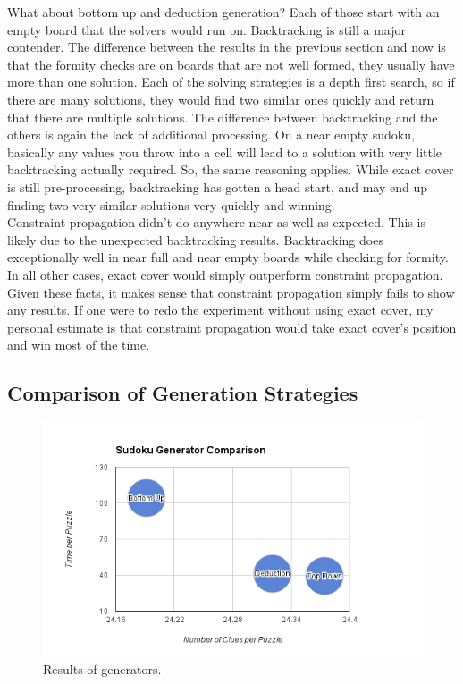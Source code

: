     What about bottom up and deduction generation? Each of those start with an empty board that the solvers would run on. Backtracking is still
    a major contender. The difference between the results in the previous section and now is that the formity checks are on boards that are
    not well formed, they usually have more than one solution. Each of the solving strategies is a depth first search, so if there are many
    solutions, they would find two similar ones quickly and return that there are multiple solutions. The difference between backtracking
    and the others is again the lack of additional processing. On a near empty sudoku, basically any values you throw into a cell will lead
    to a solution with very little backtracking actually required. So, the same reasoning applies. While exact cover is still pre-processing,
    backtracking has gotten a head start, and may end up finding two very similar solutions very quickly and winning.\\
    Constraint propagation didn't do anywhere near as well as expected. This is likely due to the unexpected backtracking results. Backtracking
    does exceptionally well in near full and near empty boards while checking for formity. In all other cases, exact cover would simply outperform
    constraint propagation. Given these facts, it makes sense that constraint propagation simply fails to show any results. If one were to redo
    the experiment without using exact cover, my personal estimate is that constraint propagation would take exact cover's position and win
    most of the time.


\subsection{Comparison of Generation Strategies}
\begin{figure}[H]
    \centering
    \includegraphics[scale=0.70]{generators.png}
    \caption{Results of generators.}
    \label{fig:generators}
\end{figure}

